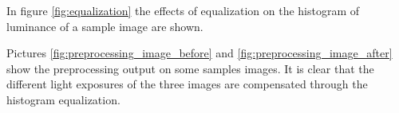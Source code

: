     \par{
        In figure \ref{fig:equalization} the effects of equalization on the histogram of luminance of a sample image are shown.
    }
    \par{
        Pictures \ref{fig:preprocessing_image_before} and \ref{fig:preprocessing_image_after} show the preprocessing output on some samples images. It is clear that the different light exposures of the three images are compensated through the histogram equalization.
    }